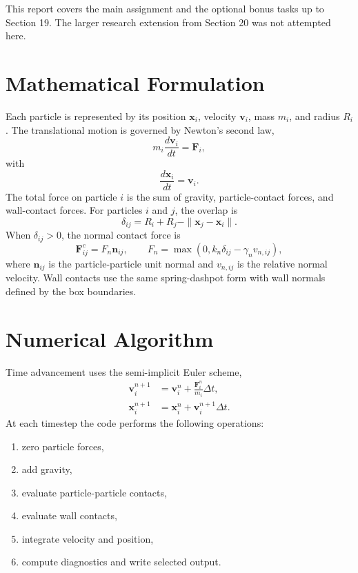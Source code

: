 \documentclass[conference]{IEEEtran}
\begin{document}
This report covers the main assignment and the optional bonus tasks up to Section 19. The larger research extension from Section 20 was not attempted here.

\section{Mathematical Formulation}
Each particle is represented by its position $\mathbf{x}_i$, velocity $\mathbf{v}_i$, mass $m_i$, and radius $R_i$. The translational motion is governed by Newton's second law,
\begin{equation}
    m_i \frac{d\mathbf{v}_i}{dt} = \mathbf{F}_i,
\end{equation}
with
\begin{equation}
    \frac{d\mathbf{x}_i}{dt} = \mathbf{v}_i.
\end{equation}
The total force on particle $i$ is the sum of gravity, particle-contact forces, and wall-contact forces. For particles $i$ and $j$, the overlap is
\begin{equation}
    \delta_{ij} = R_i + R_j - \|\mathbf{x}_j - \mathbf{x}_i\|.
\end{equation}
When $\delta_{ij} > 0$, the normal contact force is
\begin{equation}
    \mathbf{F}_{ij}^c = F_n \mathbf{n}_{ij}, \qquad
    F_n = \max(0, k_n \delta_{ij} - \gamma_n v_{n,ij}),
\end{equation}
where $\mathbf{n}_{ij}$ is the particle-particle unit normal and $v_{n,ij}$ is the relative normal velocity. Wall contacts use the same spring-dashpot form with wall normals defined by the box boundaries.

\section{Numerical Algorithm}
Time advancement uses the semi-implicit Euler scheme,
\begin{align}
    \mathbf{v}_i^{n+1} &= \mathbf{v}_i^n + \frac{\mathbf{F}_i^n}{m_i}\Delta t, \\
    \mathbf{x}_i^{n+1} &= \mathbf{x}_i^n + \mathbf{v}_i^{n+1}\Delta t.
\end{align}
At each timestep the code performs the following operations:
\begin{enumerate}
\item zero particle forces,
\item add gravity,
\item evaluate particle-particle contacts,
\item evaluate wall contacts,
\item integrate velocity and position,
\item compute diagnostics and write selected output.
\end{enumerate}
\end{document}
